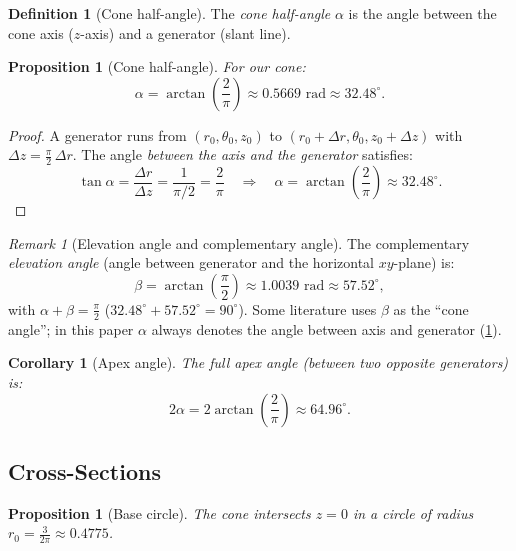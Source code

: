 \documentclass[12pt,a4paper]{article}
\theoremstyle{plain}
\newtheorem{proposition}[theorem]{Proposition}
\newtheorem{corollary}[theorem]{Corollary}
\theoremstyle{definition}
\newtheorem{definition}{Definition}[section]
\theoremstyle{remark}
\newtheorem{remark}{Remark}[section]
\begin{document}
\begin{definition}[Cone half-angle]\label{def:cone_angle}
The \emph{cone half-angle} $\alpha$ is the angle between the cone axis ($z$-axis)
and a generator (slant line).
\end{definition}

\begin{proposition}[Cone half-angle]\label{prop:cone_angle}
For our cone:
\begin{equation}\label{eq:cone_angle}
\alpha = \arctan\!\left(\frac{2}{\pi}\right) \approx 0.5669\text{ rad} \approx 32.48^\circ.
\end{equation}
\end{proposition}

\begin{proof}
A generator runs from $(r_0,\theta_0,z_0)$ to $(r_0+\Delta r,\theta_0,z_0+\Delta z)$
with $\Delta z = \tfrac{\pi}{2}\,\Delta r$. The angle \emph{between the axis and the
generator} satisfies:
\[
\tan\alpha = \frac{\Delta r}{\Delta z} = \frac{1}{\pi/2} = \frac{2}{\pi}
\quad\Rightarrow\quad
\alpha = \arctan\!\left(\frac{2}{\pi}\right) \approx 32.48^\circ.
\]
\end{proof}

\begin{remark}[Elevation angle and complementary angle]\label{rem:angles}
The complementary \emph{elevation angle} (angle between generator and the horizontal
$xy$-plane) is:
\[
\beta = \arctan\!\left(\frac{\pi}{2}\right) \approx 1.0039\text{ rad} \approx 57.52^\circ,
\]
with $\alpha+\beta = \tfrac{\pi}{2}$ ($32.48^\circ+57.52^\circ = 90^\circ$).
Some literature uses $\beta$ as the ``cone angle''; in this paper $\alpha$ always
denotes the angle between axis and generator (\cref{def:cone_angle}).
\end{remark}

\begin{corollary}[Apex angle]\label{cor:apex_angle}
The full apex angle (between two opposite generators) is:
\[
2\alpha = 2\arctan\!\left(\frac{2}{\pi}\right) \approx 64.96^\circ.
\]
\end{corollary}

\subsection{Cross-Sections}

\begin{proposition}[Base circle]\label{prop:base_circle}
The cone intersects $z=0$ in a circle of radius
$r_0 = \tfrac{3}{2\pi}\approx 0.4775$.
\end{proposition}
\end{document}
